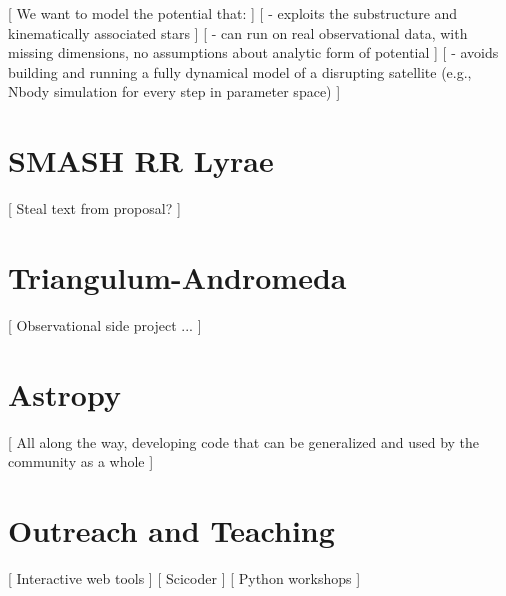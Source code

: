 \documentclass[letterpaper,12pt,preprint]{aastex}
\begin{document}
[ We want to model the potential that: ]
[ - exploits the substructure and kinematically associated stars ]
[ - can run on real observational data, with missing dimensions, no assumptions about analytic form of potential ]
[ - avoids building and running a fully dynamical model of a disrupting satellite (e.g., Nbody simulation for every step in parameter space) ]

\section{SMASH RR Lyrae}

[ Steal text from proposal? ]

\section{Triangulum-Andromeda}

[ Observational side project ... ]

\section{Astropy}

[ All along the way, developing code that can be generalized and used by the community as a whole ]

\section{Outreach and Teaching}

[ Interactive web tools ]
[ Scicoder ]
[ Python workshops ]



\end{document}
